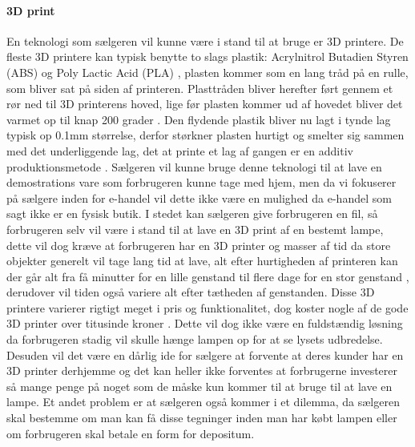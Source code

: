 \paragraph{3D print}
En teknologi som sælgeren vil kunne være i stand til at bruge er 3D printere. De fleste 3D printere kan typisk benytte to slags plastik: Acrylnitrol Butadien Styren (ABS) \cite{hvordan_3Dprinter} og Poly Lactic Acid (PLA) \cite{hvordan_3Dprinter}, plasten kommer som en lang tråd på en rulle, som bliver sat på siden af printeren. Plasttråden bliver herefter ført gennem et rør ned til 3D printerens hoved, lige før plasten kommer ud af hovedet bliver det varmet op til knap 200 grader \cite{hvordan_3Dprinter}. Den flydende plastik bliver nu lagt i tynde lag typisk op 0.1mm størrelse, derfor størkner plasten hurtigt og smelter sig sammen med det underliggende lag, det at printe et lag af gangen er en additiv produktionsmetode \cite{additiv_produktion}. Sælgeren vil kunne bruge denne teknologi til at lave en demostrations vare som forbrugeren kunne tage med hjem, men da vi fokuserer på sælgere inden for e-handel vil dette ikke være en mulighed da e-handel som sagt ikke er en fysisk butik. I stedet kan sælgeren give forbrugeren en fil, så forbrugeren selv vil være i stand til at lave en 3D print af en bestemt lampe, dette vil dog kræve at forbrugeren har en 3D printer og masser af tid da store objekter generelt vil tage lang tid at lave, alt efter hurtigheden af printeren kan der går alt fra få minutter for en lille genstand til flere dage for en stor genstand \cite{hvordan_3Dprinter}, derudover vil tiden også variere alt efter tætheden af genstanden. Disse 3D printere varierer rigtigt meget i pris og funktionalitet, dog koster nogle af de gode 3D printer over titusinde kroner \cite{3D_printer}. 
Dette vil dog ikke være en fuldstændig løsning da forbrugeren stadig vil skulle hænge lampen op for at se lysets udbredelse. Desuden vil det være en dårlig ide for sælgere at forvente at deres kunder har en 3D printer derhjemme og det kan heller ikke forventes at forbrugerne investerer så mange penge på noget som de måske kun kommer til at bruge til at lave en lampe. Et andet problem er at sælgeren også kommer i et dilemma, da sælgeren skal bestemme om man kan få disse tegninger inden man har købt lampen eller om forbrugeren skal betale en form for depositum.

